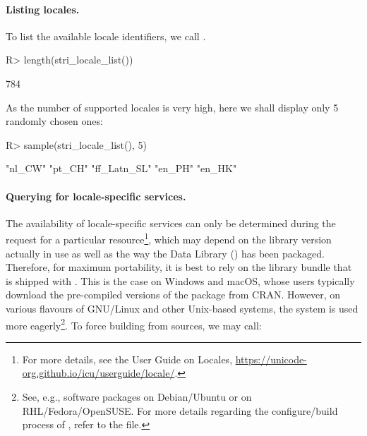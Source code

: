 \documentclass[nojss]{jss}
\begin{document}
{\color{red}

}
%
%





\paragraph{Listing locales.}
To list the available locale identifiers, we call .

\begin{Schunk}
\begin{Sinput}
R> length(stri_locale_list())
\end{Sinput}
\begin{Soutput}
[1] 784
\end{Soutput}
\end{Schunk}

\noindent
As the number of supported locales is very high, here we shall
display only 5 randomly chosen ones:

\begin{Schunk}
\begin{Sinput}
R> sample(stri_locale_list(), 5)
\end{Sinput}
\begin{Soutput}
[1] "nl_CW"      "pt_CH"      "ff_Latn_SL" "en_PH"      "en_HK"
\end{Soutput}
\end{Schunk}



\paragraph{Querying for locale-specific services.}
The availability of locale-specific services can only be determined during
the request for a particular resource\footnote{For more details,
see the  User Guide on {Locales},
\url{https://unicode-org.github.io/icu/userguide/locale/}.},
which may depend on the  library version
actually in use as well as the way the  Data Library ()
has been packaged. Therefore, for maximum portability,
it is best to rely on the  library bundle that
is shipped with .
This is the case on Windows and macOS, whose users typically download the
pre-compiled versions of the package from CRAN.
However, on various flavours of GNU/Linux and other Unix-based systems,
the system  is used more eagerly\footnote{
See, e.g., software packages
 on Debian/Ubuntu or  on RHL/Fedora/OpenSUSE.
For more details regarding the configure/build process of ,
refer to the  file.}.
To force building  from sources, we may call:
\end{document}
